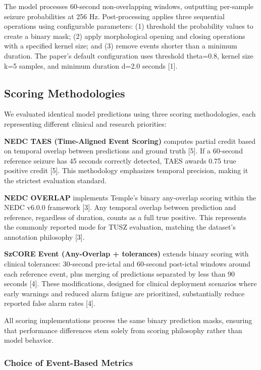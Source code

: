 \documentclass[
]{article}
\begin{document}
The model processes 60-second non-overlapping windows, outputting
per-sample seizure probabilities at 256 Hz. Post-processing applies
three sequential operations using configurable parameters: (1) threshold
the probability values to create a binary mask; (2) apply morphological
opening and closing operations with a specified kernel size; and (3)
remove events shorter than a minimum duration. The paper's default
configuration uses threshold theta=0.8, kernel size k=5 samples, and
minimum duration d=2.0 seconds {[}1{]}.

\hypertarget{scoring-methodologies}{%
\subsection{Scoring Methodologies}\label{scoring-methodologies}}

We evaluated identical model predictions using three scoring
methodologies, each representing different clinical and research
priorities:

\textbf{NEDC TAES (Time-Aligned Event Scoring)} computes partial credit
based on temporal overlap between predictions and ground truth {[}5{]}.
If a 60-second reference seizure has 45 seconds correctly detected, TAES
awards 0.75 true positive credit {[}5{]}. This methodology emphasizes
temporal precision, making it the strictest evaluation standard.

\textbf{NEDC OVERLAP} implements Temple's binary any-overlap scoring
within the NEDC v6.0.0 framework {[}3{]}. Any temporal overlap between
prediction and reference, regardless of duration, counts as a full true
positive. This represents the commonly reported mode for TUSZ
evaluation, matching the dataset's annotation philosophy {[}3{]}.

\textbf{SzCORE Event (Any-Overlap + tolerances)} extends binary scoring
with clinical tolerances: 30-second pre-ictal and 60-second post-ictal
windows around each reference event, plus merging of predictions
separated by less than 90 seconds {[}4{]}. These modifications, designed
for clinical deployment scenarios where early warnings and reduced alarm
fatigue are prioritized, substantially reduce reported false alarm rates
{[}4{]}.

All scoring implementations process the same binary prediction masks,
ensuring that performance differences stem solely from scoring
philosophy rather than model behavior.

\hypertarget{choice-of-event-based-metrics}{%
\subsubsection{Choice of Event-Based
Metrics}\label{choice-of-event-based-metrics}}
\end{document}
